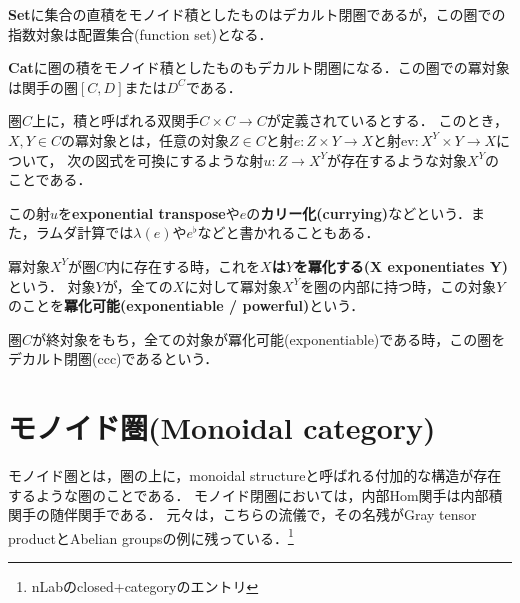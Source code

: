 \documentclass[uplatex, 12pt, dvipdfmx]{jsreport}
\begin{document}
\textbf{Set}に集合の直積をモノイド積としたものはデカルト閉圏であるが，この圏での指数対象は配置集合(function set)となる．

\textbf{Cat}に圏の積をモノイド積としたものもデカルト閉圏になる．この圏での冪対象は関手の圏$[C,D]$または$D^C$である．

\begin{definition}\rm{}
    圏$C$上に，積と呼ばれる双関手$C\times C\to C$が定義されているとする．
    このとき，$X, Y\in C$の冪対象とは，任意の対象$Z\in C$と射$e:Z\times Y\to X$と射$\mathrm{ev}:X^Y\times Y\to X$について，
    次の図式を可換にするような射$u:Z\to X^Y$が存在するような対象$X^Y$のことである．
    \begin{center}\end{center}
    この射$u$を\textbf{exponential transpose}や$e$の\textbf{カリー化(currying)}などという．また，ラムダ計算では$\lambda(e)$や$e^\flat$などと書かれることもある．
\end{definition}
冪対象$X^Y$が圏$C$内に存在する時，これを\textbf{$X$は$Y$を冪化する(X exponentiates Y)}という．
対象$Y$が，全ての$X$に対して冪対象$X^Y$を圏の内部に持つ時，この対象$Y$のことを\textbf{冪化可能(exponentiable / powerful)}という．

\begin{definition}\rm{}
    圏$C$が終対象をもち，全ての対象が冪化可能(exponentiable)である時，この圏をデカルト閉圏(ccc)であるという．
\end{definition}

\chapter{モノイド圏(Monoidal category)}
モノイド圏とは，圏の上に，monoidal structureと呼ばれる付加的な構造が存在するような圏のことである．
モノイド閉圏においては，内部Hom関手は内部積関手の随伴関手である．
元々は，こちらの流儀で，その名残がGray tensor productとAbelian groupsの例に残っている．\footnote{nLabのclosed+categoryのエントリ}
\end{document}
